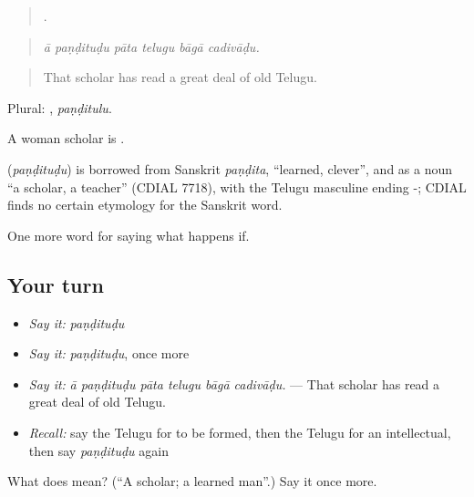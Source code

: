 \begin{quote}
     .
\end{quote}

\begin{quote}
\emph{ā paṇḍituḍu pāta telugu bāgā cadivāḍu.}
\end{quote}

\begin{quote}
That scholar has read a great deal of old Telugu.
\end{quote}

Plural: , \emph{paṇḍitulu}.

A woman scholar is .

\begin{cousinweb}
\textbf{} (\emph{paṇḍituḍu}) is borrowed from Sanskrit \emph{paṇḍita}, \textquotedblleft{}learned, clever\textquotedblright{}, and as a noun \textquotedblleft{}a scholar, a teacher\textquotedblright{} (CDIAL 7718), with the Telugu masculine ending -; CDIAL finds no certain etymology for the Sanskrit word.
\end{cousinweb}

\begin{grammarlens}[title={What you've built}]
One more word for saying what happens if.
\end{grammarlens}

\subsection*{Your turn}
\begin{itemize}
\raggedright
  \item \emph{Say it:} \emph{paṇḍituḍu}
  \item \emph{Say it:} \emph{paṇḍituḍu}, once more
  \item \emph{Say it:} \emph{ā paṇḍituḍu pāta telugu bāgā cadivāḍu.} — That scholar has read a great deal of old Telugu.
  \item \emph{Recall:} say the Telugu for to be formed, then the Telugu for an intellectual, then say \emph{paṇḍituḍu} again
\end{itemize}

\begin{tcolorbox}[breakable,colback=teal!4,colframe=teal!35!black,title={Before you move on}]
What does  mean? (\textquotedblleft{}A scholar; a learned man\textquotedblright{}.) Say it once more.
\end{tcolorbox}
